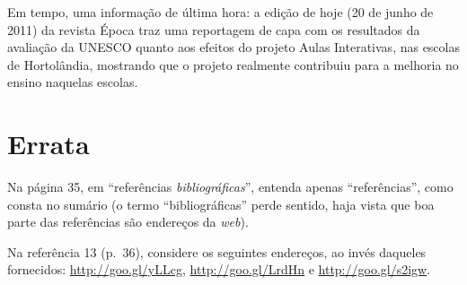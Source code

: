 \documentclass[a4paper,10pt]{scrartcl}					%
\newcommand\foreign[1]{\textsl{#1}}
\begin{document}
	Em tempo, uma informação de última hora: a edição de hoje (20 de junho de 2011) da revista Época traz uma reportagem de capa com os resultados da avaliação da UNESCO quanto aos efeitos do projeto Aulas Interativas, nas escolas de Hortolândia, mostrando que o projeto realmente contribuiu para a melhoria no ensino naquelas escolas.
	

	\section{Errata}
	
	\begin{compactitem}
		\item Na página 35, em ``referências \emph{bibliográficas}'', entenda apenas ``referências'', como consta no sumário (o termo ``bibliográficas'' perde sentido, haja vista que boa parte das referências são endereços da \foreign{web}).
		\item Na referência 13 (p.~36), considere os seguintes endereços, ao invés daqueles fornecidos: \url{http://goo.gl/yLLcg}, \url{http://goo.gl/LrdHn} e \url{http://goo.gl/s2igw}.
	\end{compactitem}
\end{document}
